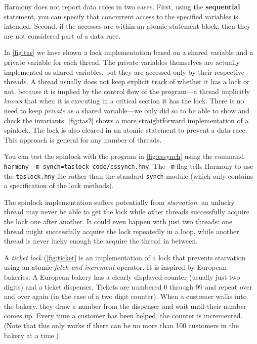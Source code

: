 \documentclass{report}
\begin{document}
Harmony does not report data races in two cases.
First, using the \textbf{sequential} statement, you can specify that
concurrent access to the specified variables is intended.
Second, if the accesses are within an atomic statement block, then they
are not considered part of a data race.

In \autoref{fig:tas} we have shown a lock implementation based on a shared
variable and a private variable for each thread.   The private
variables themselves are actually implemented as shared variables,
but they are accessed only by their respective threads.
A thread usually does not keep explicit track of whether it has a lock
or not, because it is implied by the control flow of the program---a
thread implicitly \emph{knows} that when it is executing in a critical
section it has the lock.
There is no need to keep \textit{private} as a shared
variable---we only did so to be able to show and check the invariants.
\autoref{fig:tas2} shows a more straightforward implementation of a spinlock.
The lock is also cleared in an atomic statement to prevent a data race.
This approach is general for any number of threads.

You can test the spinlock with the program in \autoref{fig:cssynch}
using the command \texttt{harmony -m synch=taslock code/cssynch.hny}.
The \texttt{-m} flag tells Harmony to use the \texttt{taslock.hny} file
rather than the standard \texttt{synch} module (which only contains
a specification of the lock methods).

%
The spinlock implementation suffers potentially from \emph{starvation}:
an unlucky thread may never be able to get the lock while other threads
successfully acquire the lock one after another.  It could even happen
with just two threads: one thread might successfully acquire the lock
repeatedly in a loop, while another thread is never lucky enough the
acquire the thread in between.

A \emph{ticket lock} (\autoref{fig:ticket} is an implementation of a
lock that prevents starvation using an atomic \emph{fetch-and-increment}
operator.  It is inspired by European bakeries.  A European bakery has a
clearly displayed counter (usually just two digits) and a ticket dispenser.
Tickets are numbered 0 through 99 and repeat over and over again
(in the case of a two digit counter).
When a customer walks into the bakery, they draw a number from the dispenser
and wait until their number comes up.
Every time a customer has been helped, the counter is incremented.
(Note that this only works if there can be no more than 100 customers in
the bakery at a time.)
\end{document}
